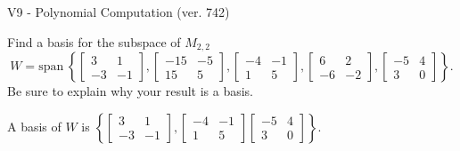 \begin{exercise}
  \begin{exerciseTitle}V9 - Polynomial Computation (ver. 742)\end{exerciseTitle}
  \begin{exerciseStatement}
    Find a basis for the subspace of \(M_{2,2}\) 
\[W=\mathrm{span}\ \left\{\left[\begin{array}{cc}
3 & 1 \\
-3 & -1
\end{array}\right] , \left[\begin{array}{cc}
-15 & -5 \\
15 & 5
\end{array}\right] , \left[\begin{array}{cc}
-4 & -1 \\
1 & 5
\end{array}\right] , \left[\begin{array}{cc}
6 & 2 \\
-6 & -2
\end{array}\right] , \left[\begin{array}{cc}
-5 & 4 \\
3 & 0
\end{array}\right]\right\}.\]
 Be sure to explain why your result is a basis.


  \end{exerciseStatement}
  \begin{exerciseAnswer}
   A basis of \(W\) is  \(\left\{\left[\begin{array}{cc}
3 & 1 \\
-3 & -1
\end{array}\right] , \left[\begin{array}{cc}
-4 & -1 \\
1 & 5
\end{array}\right] \left[\begin{array}{cc}
-5 & 4 \\
3 & 0
\end{array}\right]\right\}\).
  


  \end{exerciseAnswer}
\end{exercise}